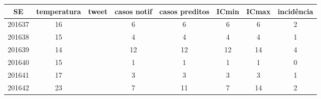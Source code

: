 \begin{tabular}{c|ccccccc}
  \hline
SE & temperatura & tweet & casos notif & casos preditos & ICmin & ICmax & incidência \\ 
  \hline
201637 & 16 &  & 6 & 6 & 6 & 6 & 2 \\ 
  201638 & 15 &  & 4 & 4 & 4 & 4 & 1 \\ 
  201639 & 14 &  & 12 & 12 & 12 & 14 & 4 \\ 
  201640 & 15 &  & 1 & 1 & 1 & 1 & 0 \\ 
  201641 & 17 &  & 3 & 3 & 3 & 3 & 1 \\ 
  201642 & 23 &  & 7 & 11 & 7 & 14 & 2 \\ 
   \hline
\end{tabular}
